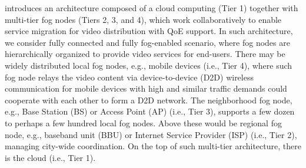 introduces an architecture composed of a cloud computing (Tier 1) together with multi-tier fog nodes (Tiers 2, 3, and 4), which work collaboratively to enable service migration for video distribution with QoE support. In such architecture, we consider fully connected and fully fog-enabled scenario, where fog nodes are hierarchically organized to provide video services for end-users. There may be widely distributed local fog nodes, e.g., mobile devices (i.e., Tier 4), where such fog node relays the video content via device-to-device (D2D) wireless communication for mobile devices with high and similar traffic demands could cooperate with each other to form a D2D network. The neighborhood fog node, e.g., Base Station (BS) or Access Point (AP) (i.e., Tier 3), supports a few dozen to perhaps a few hundred local fog nodes. Above these would be regional fog node, e.g., baseband unit (BBU) or Internet Service Provider (ISP) (i.e., Tier 2), managing city-wide coordination. On the top of such multi-tier architecture, there is the cloud (i.e., Tier 1). 

